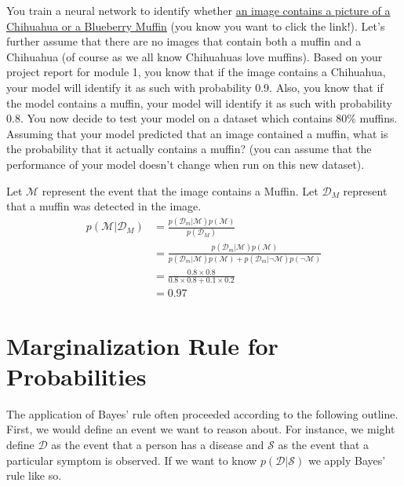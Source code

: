 \documentclass[assignment01_Solutions]{subfiles}
\begin{document}
\begin{exercise}[(20 minutes)]
\item You train a neural network to identify whether \href{https://www.freecodecamp.org/news/chihuahua-or-muffin-my-search-for-the-best-computer-vision-api-cbda4d6b425d/}{an image contains a picture of a Chihuahua or a Blueberry Muffin} (you know you want to click the link!).  Let's further assume that there are no images that contain both a muffin and a Chihuahua (of course as we all know Chihuahuas love muffins).  Based on your project report for module 1, you know that if the image contains a Chihuahua, your model will identify it as such with probability 0.9.  Also, you know that if the model contains a muffin, your model will identify it as such with probability 0.8.  You now decide to test your model on a dataset which contains 80\% muffins.  Assuming that your model predicted that an image contained a muffin, what is the probability that it actually contains a muffin? (you can assume that the performance of your model doesn't change when run on this new dataset).

\begin{boxedsolution}
Let $\mathcal{M}$ represent the event that the image contains a Muffin.  Let $\mathcal{D}_M$ represent that a muffin was detected in the image.
\begin{align}
p(\mathcal{M} | \mathcal{D}_M) &= \frac{p(\mathcal{D}_m | \mathcal{M})  p(\mathcal{M})}{p(\mathcal{D}_M)} \\
&= \frac{p(\mathcal{D}_m | \mathcal{M})  p(\mathcal{M})}{ p(\mathcal{D}_m | \mathcal{M})  p(\mathcal{M}) + p(\mathcal{D}_m | \neg \mathcal{M})  p(\neg \mathcal{M})} \\
&= \frac{0.8 \times 0.8}{0.8 \times 0.8 + 0.1 \times 0.2} \\
&= 0.97
\end{align}
\end{boxedsolution}
\ees
\end{exercise}

\section{Marginalization Rule for Probabilities}
The application of Bayes' rule often proceeded according to the following outline.  First, we would define an event we want to reason about. For instance, we might define $\mathcal{D}$ as the event that a person has a disease and $\mathcal{S}$ as the event that a particular symptom is observed.  If we want to know $p(\mathcal{D} | \mathcal{S})$ we apply Bayes' rule like so.
\end{document}
